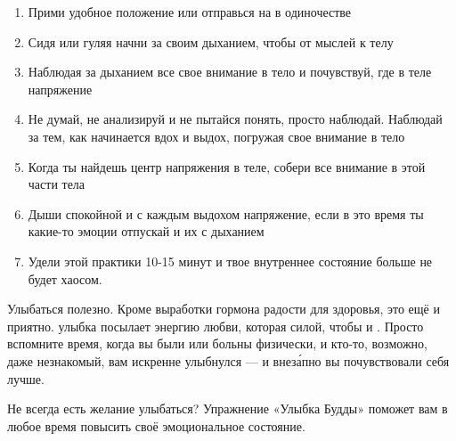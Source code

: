 \begin{enumerate}
    \item Прими удобное положение или отправься на  в одиночестве

    \item Сидя или гуляя начни  за своим дыханием, чтобы  от мыслей к телу

    \item Наблюдая за дыханием  все свое внимание в тело и почувствуй, где в теле  напряжение

    \item Не думай, не анализируй и не пытайся понять, просто наблюдай.
          Наблюдай за тем, как начинается вдох и выдох, погружая свое внимание в тело

    \item Когда ты найдешь центр напряжения в теле, собери все внимание в этой части тела

    \item Дыши спокойной и с каждым выдохом  напряжение,
          если в это время ты  какие-то эмоции
          отпускай и их с дыханием

    \item Удели этой практики 10-15 минут и твое внутреннее состояние больше не будет  хаосом.
\end{enumerate}

Улыбаться полезно. Кроме выработки гормона радости для здоровья, это ещё и приятно.
 улыбка посылает энергию любви,
которая  силой, чтобы  и . Просто вспомните время, когда вы были  или больны физически, и кто-то, возможно, даже незнакомый, вам искренне улыбнулся --- и внез\'{а}пно вы почувствовали себя лучше.

Не всегда есть желание улыбаться? Упражнение «Улыбка Будды» поможет вам в любое время повысить своё эмоциональное состояние.

